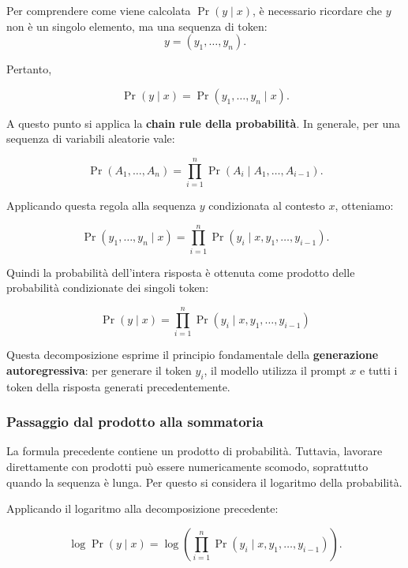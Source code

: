 Per comprendere come viene calcolata $\Pr(y\mid x)$, è necessario ricordare che $y$ non è un singolo elemento, ma una sequenza di token:
\[
y=(y_1,\ldots,y_n).
\]

Pertanto,

\begin{equation}
\Pr(y\mid x)
=
\Pr(y_1,\ldots,y_n\mid x).
\end{equation}

A questo punto si applica la \textbf{chain rule della probabilità}. In generale, per una sequenza di variabili aleatorie vale:

\begin{equation}
\Pr(A_1,\ldots,A_n)
=
\prod_{i=1}^{n}
\Pr(A_i\mid A_1,\ldots,A_{i-1}).
\end{equation}

Applicando questa regola alla sequenza $y$ condizionata al contesto $x$, otteniamo:

\begin{equation}
\Pr(y_1,\ldots,y_n\mid x)
=
\prod_{i=1}^{n}
\Pr(y_i\mid x,y_1,\ldots,y_{i-1}).
\end{equation}

Quindi la probabilità dell'intera risposta è ottenuta come prodotto delle probabilità condizionate dei singoli token:

\begin{equation}
\boxed{
\Pr(y\mid x)
=
\prod_{i=1}^{n}
\Pr(y_i\mid x,y_1,\ldots,y_{i-1})
}
\end{equation}

Questa decomposizione esprime il principio fondamentale della \textbf{generazione autoregressiva}: per generare il token $y_i$, il modello utilizza il prompt $x$ e tutti i token della risposta generati precedentemente.

\subsubsection*{Passaggio dal prodotto alla sommatoria}

La formula precedente contiene un prodotto di probabilità. Tuttavia, lavorare direttamente con prodotti può essere numericamente scomodo, soprattutto quando la sequenza è lunga. Per questo si considera il logaritmo della probabilità.

Applicando il logaritmo alla decomposizione precedente:

\begin{equation}
\log \Pr(y\mid x)
=
\log
\left(
\prod_{i=1}^{n}
\Pr(y_i\mid x,y_1,\ldots,y_{i-1})
\right).
\end{equation}

